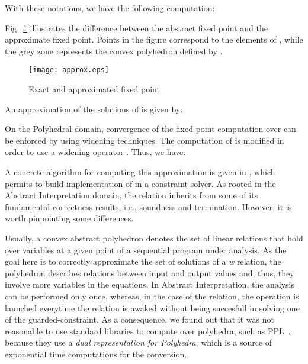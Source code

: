\documentclass[submission,copyright,creativecommons]{eptcs}
\begin{document}
\noindent
With these notations, we have the following computation: 


\noindent
Fig.~\ref{approx} illustrates the difference between the abstract fixed point and the approximate fixed point.
Points in the figure correspond to the elements of , while the grey zone represents the convex polyhedron defined by . 

\begin{figure}
\begin{center}
  \texttt{[image: approx.eps]}
\end{center}
\caption{Exact and approximated fixed point}
\label{approx}
\end{figure}

\noindent
An approximation of the solutions of  is given by: 


\noindent
On the Polyhedral domain, convergence of the fixed point computation over  can be enforced by using widening techniques.
The computation of  is modified in order to use a widening operator  \cite{CH78}. Thus, we have: 












\noindent
A concrete algorithm for computing this approximation is given in \cite{DGD07a}, which permits to build implementation of  in a constraint solver. As rooted in the Abstract Interpretation domain, the relation  inherits from some of its fundamental correctness results, i.e., soundness and termination.  However, it is worth pinpointing some differences.

\noindent
Usually, a convex abstract polyhedron denotes the set of linear relations that hold
over variables at a given point of a sequential program under analysis. 
As the goal here is to correctly approximate the set of solutions of a \textit{w} relation, the polyhedron describes
relations between input and output values and, thus, they
involve more variables in the equations. In Abstract Interpretation, the
analysis can be performed only once, whereas, in the case of the  relation, the  operation is launched everytime the relation is awaked without being succesfull in solving one of the guarded-constraint.
As a consequence, we found out that it was not reasonable to use standard libraries to compute over polyhedra, such as PPL~\cite{BRZ02}, 
because they use a {\it dual representation for Polyhedra}, which is a source of exponential time
computations for the conversion.  
\end{document}
